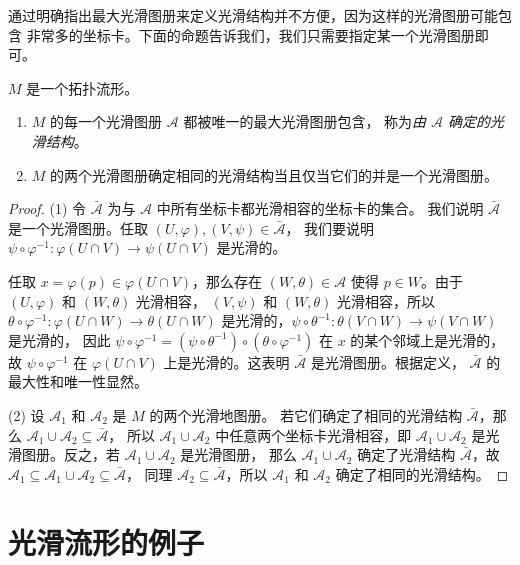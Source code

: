 \documentclass[fontset=none]{Notes}
\begin{document}
通过明确指出最大光滑图册来定义光滑结构并不方便，因为这样的光滑图册可能包含
非常多的坐标卡。下面的命题告诉我们，我们只需要指定某一个光滑图册即可。

\begin{proposition}
  $M$ 是一个拓扑流形。
  \begin{enumerate}
    \item $M$ 的每一个光滑图册 $\mathcal{A}$ 都被唯一的最大光滑图册包含，
    称为\emph{由 $\mathcal{A}$ 确定的光滑结构}。
    \item $M$ 的两个光滑图册确定相同的光滑结构当且仅当它们的并是一个光滑图册。
  \end{enumerate}
\end{proposition}
\begin{proof}
  (1) 令 $\bar{\mathcal{A}}$ 为与 $\mathcal{A}$ 中所有坐标卡都光滑相容的坐标卡的集合。
  我们说明 $\bar{\mathcal{A}}$ 是一个光滑图册。任取 $(U,\varphi),(V,\psi)\in \bar{\mathcal{A}}$，
  我们要说明 $\psi\circ\varphi^{-1}:\varphi(U\cap V)\to\psi(U\cap V)$ 是光滑的。

  任取 $x=\varphi(p)\in\varphi(U\cap V)$，那么存在 $(W,\theta)\in\mathcal{A}$ 
  使得 $p\in W$。由于 $(U,\varphi)$ 和 $(W,\theta)$ 光滑相容，
  $(V,\psi)$ 和 $(W,\theta)$ 光滑相容，所以 $\theta\circ\varphi^{-1}:\varphi(U\cap W)\to\theta(U\cap W)$
  是光滑的，$\psi\circ\theta^{-1}:\theta(V\cap W)\to\psi(V\cap W)$ 是光滑的，
  因此 $\psi\circ\varphi^{-1}=(\psi\circ\theta^{-1})\circ(\theta\circ\varphi^{-1})$
  在 $x$ 的某个邻域上是光滑的，故 $\psi\circ\varphi^{-1}$ 在 $\varphi(U\cap V)$
  上是光滑的。这表明 $\bar{\mathcal{A}}$ 是光滑图册。根据定义，
  $\bar{\mathcal{A}}$ 的最大性和唯一性显然。

  (2) 设 $\mathcal{A}_1$ 和 $\mathcal{A}_2$ 是 $M$ 的两个光滑地图册。
  若它们确定了相同的光滑结构 $\bar{\mathcal{A}}$，那么 $\mathcal{A}_1\cup\mathcal{A}_2\subseteq\bar{\mathcal{A}}$，
  所以 $\mathcal{A}_1\cup\mathcal{A}_2$ 中任意两个坐标卡光滑相容，即 $\mathcal{A}_1\cup\mathcal{A}_2$
  是光滑图册。反之，若 $\mathcal{A}_1\cup\mathcal{A}_2$ 是光滑图册，
  那么 $\mathcal{A}_1\cup\mathcal{A}_2$ 确定了光滑结构 $\bar{\mathcal{A}}$，故
  $\mathcal{A}_1\subseteq\mathcal{A}_1\cup\mathcal{A}_2\subseteq\bar{\mathcal{A}}$，
  同理 $\mathcal{A}_2\subseteq\bar{\mathcal{A}}$，所以 $\mathcal{A}_1$ 和 $\mathcal{A}_2$
  确定了相同的光滑结构。
\end{proof}


\section{光滑流形的例子}
\end{document}
